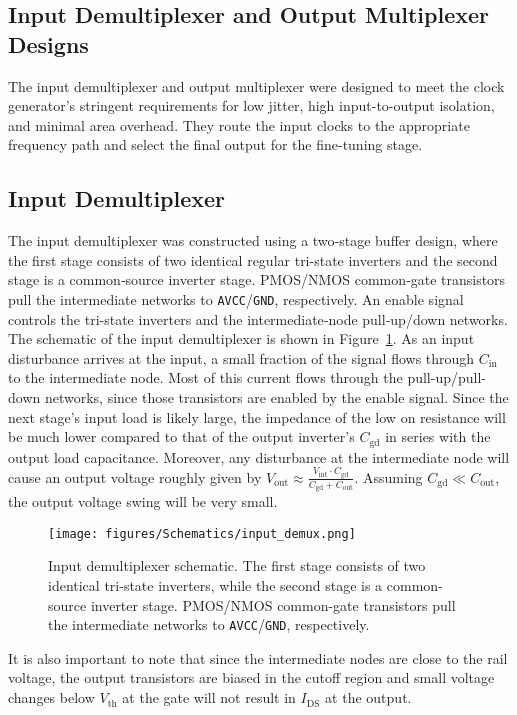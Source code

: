 \subsection*{Input Demultiplexer and Output Multiplexer Designs}\label{sec:demux_mux_design}
The input demultiplexer and output multiplexer were designed to meet the clock generator's stringent requirements for low jitter, high input-to-output isolation, and minimal area overhead. They route the input clocks to the appropriate frequency path and select the final output for the fine-tuning stage.
\subsection{Input Demultiplexer}
The input demultiplexer was constructed using a two‑stage buffer design, where the first stage consists of two identical regular tri-state inverters and the second stage is a common‑source inverter stage. PMOS/NMOS common‑gate transistors pull the intermediate networks to \texttt{AVCC}/\texttt{GND}, respectively. An enable signal controls the tri-state inverters and the intermediate‑node pull‑up/down networks.
The schematic of the input demultiplexer is shown in Figure~\ref{fig:input_demux}. As an input disturbance arrives at the input, a small fraction of the signal flows through \(C_{\text{in}}\) to the intermediate node. Most of this current flows through the pull-up/pull-down networks, since those transistors are enabled by the enable signal. Since the next stage's input load is likely large, the impedance of the low on resistance will be much lower compared to that of the output inverter's \(C_{\text{gd}}\) in series with the output load capacitance. Moreover, any disturbance at the intermediate node will cause an output voltage roughly given by \(V_{\text{out}} \approx \frac{V_{\text{int}}\cdot C_{\text{gd}}}{C_{\text{gd}} + C_{\text{out}}}\). Assuming \(C_{\text{gd}} \ll C_{\text{out}}\), the output voltage swing will be very small.
\begin{figure}[h]
  \centering
  \texttt{[image: figures/Schematics/input\_demux.png]}
  \caption{Input demultiplexer schematic. The first stage consists of two identical tri-state inverters, while the second stage is a common-source inverter stage. PMOS/NMOS common-gate transistors pull the intermediate networks to \texttt{AVCC}/\texttt{GND}, respectively.}
  \label{fig:input_demux}
\end{figure}
It is also important to note that since the intermediate nodes are close to the rail voltage, the output transistors are biased in the cutoff region and small voltage changes below \(V_\text{th}\) at the gate will not result in \(I_\text{DS}\) at the output.
